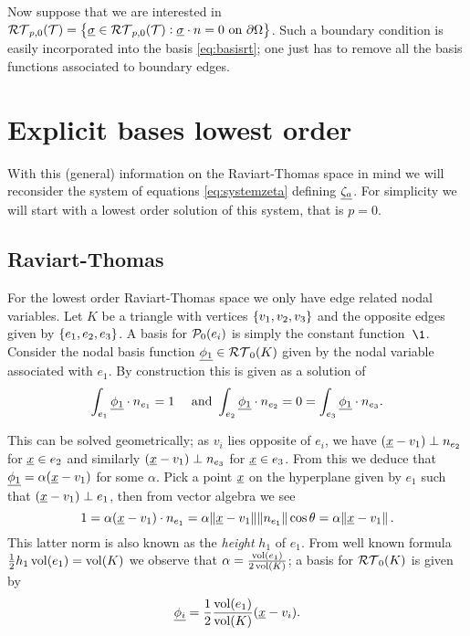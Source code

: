 \documentclass[thesis.tex]{subfiles}
\begin{document}
Now suppose that we are interested in $\RT_{p,0}( \T) = \set{ \vsig \in \RT_{p,0}( \T) : \vsig \cdot n = 0 \text{ on } \partial  \O}$.
Such a boundary condition is easily incorporated into the basis \eqref{eq:basisrt}; one just has to remove all the basis functions associated
to boundary edges.

\section{Explicit bases lowest order}
With this (general) information on the  Raviart-Thomas space in mind we will reconsider the
system of equations \eqref{eq:systemzeta} defining $\vzeta$. For simplicity we will start
with a lowest order solution of this system, that is $p=0$.  

\subsection{Raviart-Thomas}
For the lowest order Raviart-Thomas space we only have edge related nodal variables.
Let $K$ be a triangle with vertices $\set{v_1, v_2, v_3}$ and the opposite edges given by $\set{e_1, e_2, e_3}$.
A basis for $\P_0(e_i)$ is simply the constant function~$\1$.
Consider the nodal basis function $\v{\phi_1} \in \RT_0(K)$ given by the nodal variable associated with $e_1$.
By construction this is given as a solution of
\[
  \int_{e_1} \v{\phi_1}\cdot n_{e_1} = 1 \quad \text{ and } \int_{e_2} \v{\phi_1} \cdot n_{e_2} = 0 = \int_{e_3} \v{\phi_1} \cdot n_{e_3}.
\]

This can be solved geometrically; as $v_i$ lies opposite of $e_i$, we have $(\v{x} - v_1) \perp n_{e_2}$ for $\v{x} \in e_2$ and similarly $(\v{x} - v_1) \perp  n_{e_3}$ for $\v{x} \in e_3$.
From this we deduce that $\v{\phi_1} = \alpha (\v{x} - v_1)$ for some $\alpha$. Pick a  point $\v{x}$ on the hyperplane given by $e_1$ such that
$(\v{x} - v_1) \perp e_1$, then from vector algebra we see
\[
  1 = \alpha(\v{x} - v_1)\cdot n_{e_1} = \alpha \norm{\v{x} - v_1}\norm{n_{e_1}} \cos \theta = \alpha \norm{\v{x} - v_1}.
\]
This latter norm is also known as the \emph{height} $h_1$ of $e_1$. From well known formula $\frac{1}{2} h_1 \vol(e_1) = \vol(K)$
we observe that $\alpha = \frac{\vol(e_1)}{2\vol(K)}$; a  basis for $\RT_0(K)$ is given by
\[
  \v{\phi_i} = \frac{1}{2}\frac{\vol(e_1)}{\vol(K)}( \v{x} - v_i).
\]
\end{document}
